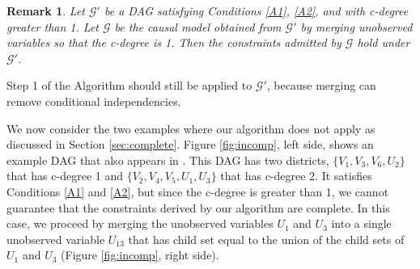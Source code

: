 \documentclass[12pt]{article}
\newtheorem{remark}{Remark}
\begin{document}
\begin{remark}
\label{prop:merge}
Let $\mathcal{G}'$ be a DAG satisfying Conditions \ref{A1}, \ref{A2}, and with c-degree greater than 1. Let $\mathcal{G}$ be the causal model obtained from $\mathcal{G}'$ by merging unobserved variables so that the c-degree is 1. 
Then the constraints admitted by $\mathcal{G}$ hold under $\mathcal{G}'$.
\end{remark}

Step 1 of the Algorithm should still be applied to $\mathcal{G}'$, because merging can remove conditional independencies.

We now consider the two examples where our algorithm does not apply as discussed in Section \ref{sec:complete}.
Figure \ref{fig:incomp}, left side, shows an example DAG that also appears in  \citet{duarte2023automated}. This DAG has two districts, $\{V_1, V_3, V_6, U_2\}$ that has c-degree 1 and $\{V_2, V_4, V_5, U_1, U_3\}$ that has c-degree 2. It satisfies Conditions \ref{A1} and \ref{A2}, but since the c-degree is greater than 1, we cannot guarantee that the constraints derived by our algorithm are complete. In this case, we proceed by merging the unobserved variables $U_1$ and $U_3$ into a single unobserved variable $U_{13}$ that has child set equal to the union of the child sets of $U_1$ and $U_3$ (Figure \ref{fig:incomp}, right side).
\end{document}
